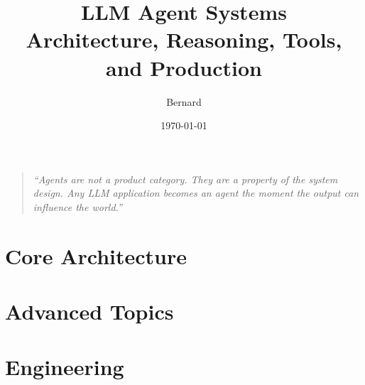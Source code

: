 \documentclass[11pt,a4paper]{book}
\theoremstyle{definition}
\theoremstyle{plain}
\begin{document}
\title{\Huge\textbf{LLM Agent Systems}\\[0.5cm]
	\large Architecture, Reasoning, Tools, and Production}
\author{Bernard}
\date{\today}
\maketitle
\thispagestyle{empty}

\vfill
\begin{quote}
	\emph{``Agents are not a product category. They are a property of the system design. Any LLM application becomes an agent the moment the output can influence the world.''}
\end{quote}
\vfill

\newpage
\tableofcontents
\newpage



\part{Core Architecture}





\part{Advanced Topics}




\part{Engineering}




\newpage


\end{document}
